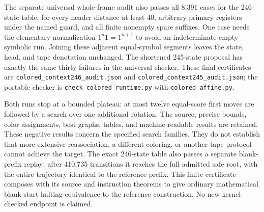 The separate universal whole-frame audit also passes all 8,391 cases for
the 246-state table, for every header distance at least 40, arbitrary primary
registers under the named guard, and all finite nonempty spare suffixes.
One case needs the elementary normalization $1^n1=1^{n+1}$ to avoid an
indeterminate empty symbolic run. Joining these adjacent equal-symbol
segments leaves the state, head, and tape denotation unchanged. The
shortened 245-state proposal has exactly the same thirty failures in the
universal checker. These final certificates are
\texttt{colored\_context246\_audit.json} and
\texttt{colored\_context245\_audit.json}; the portable checker is
\texttt{check\_colored\_runtime.py} with \texttt{colored\_affine.py}.

Both runs stop at a bounded plateau: at most twelve equal-score first moves
are followed by a search over one additional rotation. The source, precise
bounds, color assignments, best graphs, tables, and machine-readable results
are retained. These negative results concern the specified search families.
They do not establish that more extensive reassociation, a different
coloring, or another tape protocol cannot achieve the target. The exact 246-state table also passes a separate
blank-prefix replay: after 410,735 transitions it reaches the full admitted
safe root, with the entire trajectory identical to the reference prefix.
This finite certificate composes with its source and instruction theorems
to give ordinary mathematical blank-start halting equivalence to the
reference construction. No new kernel-checked endpoint is claimed.
